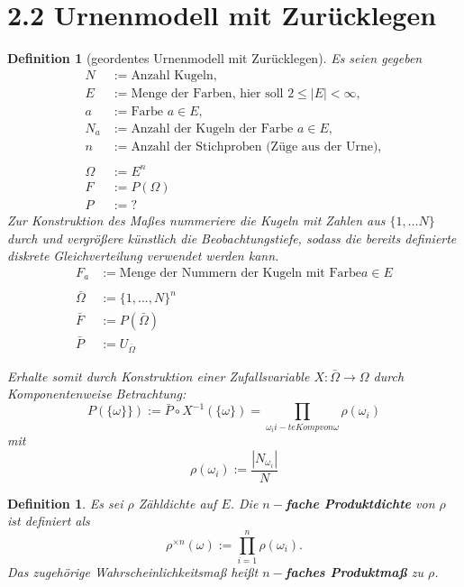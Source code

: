 \documentclass[a4paper,12pt]{article}%
\newtheorem{myDef}[thm]{Definition}
\begin{document}
	\section{2.2 Urnenmodell mit Zurücklegen }
	\begin{myDef}[geordentes Urnenmodell mit Zurücklegen]
		Es seien gegeben
		\begin{align*}
			N &:= \text{Anzahl Kugeln}, \\
			E &:= \text{Menge der Farben, hier soll } 2\leq |E| < \infty, \\
			a &:= \text{Farbe } a \in E,\\
			N_a &:= \text{Anzahl der Kugeln der Farbe } a \in E,\\
			n&:= \text{Anzahl der Stichproben (Züge aus der Urne)}, \\
	\\
	\Omega&:=E^n \\
	F&:=P(\Omega) \\
	P &:= ?
		\end{align*}
		Zur Konstruktion des Maßes nummeriere die Kugeln mit Zahlen aus $\{1,\dots N \}$ durch und vergrößere künstlich die Beobachtungstiefe, sodass die bereits definierte diskrete Gleichverteilung verwendet werden kann.
		\begin{align*}
			F_a &:= \text{Menge der Nummern der Kugeln mit Farbe} a \in E\\
			\\
			\bar \Omega&:=\{1, \dots, N \}^n \\
			\bar F&:=P(\bar \Omega) 			\\
			\bar P &:= U_{\bar \Omega}
		\end{align*}
		
		Erhalte somit durch Konstruktion einer Zufallsvariable $X : \bar \Omega \rightarrow \Omega$ durch Komponentenweise Betrachtung:
		$$ P(\{\omega\}\}) := \bar P \circ X^{-1} (\{\omega \}) = \prod\limits_{\omega_i i-te Komp von \omega} \rho(\omega_i) $$
		mit 
		$$ \rho(\omega_i) := \frac{|N_{\omega_i}|}{N}$$
	\end{myDef}
	
	\begin{myDef}
		Es sei $\rho$ Zähldichte auf $E$. Die {\bf $n-$fache Produktdichte} von $\rho$ ist definiert als $$\rho^{\times n} (\omega) := \prod \limits_{i = 1}^{n} \rho(\omega_i).$$
		Das zugehörige Wahrscheinlichkeitsmaß heißt {\bf $n-$faches Produktmaß} zu $\rho$.
	\end{myDef}
	
\end{document}
